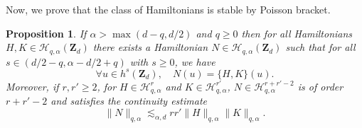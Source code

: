 \documentclass[11pt]{article}
\newtheorem{proposition}[theorem]{Proposition}
\theoremstyle{definition}
\begin{document}
Now, we prove that the class of Hamiltonians is stable by Poisson bracket.
\begin{proposition}
\label{prop_stable_Poisson}
If $\alpha>\max(d-q,d/2)$ and $q\geq 0$ then for all Hamiltonians $H,K \in \mathscr{H}_{q,\alpha}(\mathbf{Z}_d)$ there exists a Hamiltonian $N \in \mathscr{H}_{q,\alpha}(\mathbf{Z}_d)$ such that for all $s\in (d/2-q, \alpha-d/2+q)$ with $s\geq 0$, we have
\[
\forall u \in h^s(\mathbf{Z}_d), \quad N(u) = \{ H,K\}(u).
\]
Moreover, if $r,r'\geq 2$, for $H\in \mathscr{H}_{q,\alpha}^r$ and $K\in \mathscr{H}_{q,\alpha}^{r'}$, $N \in \mathscr{H}_{q,\alpha}^{r+r'-2}$ is of order $r+r'-2$ and satisfies the continuity estimate
\begin{equation}
\label{eq_cont_est_Poisson}
\| N\|_{q,\alpha} \lesssim_{\alpha,d} r r' \| H \|_{q,\alpha} \| K \|_{q,\alpha}.
\end{equation}
\end{proposition}
\end{document}
